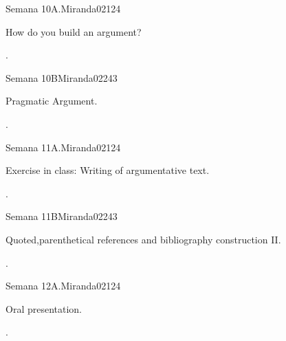 \begin{syllabus}
\begin{unit}{Semana 10A.}{}{Miranda02}{12}{4}
   \begin{topics}
      \item How do you build an argument?
   \end{topics}
   \begin{learningoutcomes}
      \item .
   \end{learningoutcomes}
\end{unit}

\begin{unit}{Semana 10B}{}{Miranda02}{24}{3}
   \begin{topics}
      \item Pragmatic Argument.
   \end{topics}

   \begin{learningoutcomes}
      \item . 
      \end{learningoutcomes}
\end{unit}

\begin{unit}{Semana 11A.}{}{Miranda02}{12}{4}
   \begin{topics}
      \item Exercise in class: Writing of argumentative text.
   \end{topics}
   \begin{learningoutcomes}
      \item .
   \end{learningoutcomes}
\end{unit}

\begin{unit}{Semana 11B}{}{Miranda02}{24}{3}
   \begin{topics}
      \item Quoted,parenthetical references and bibliography construction II.
   \end{topics}

   \begin{learningoutcomes}
      \item .
      \end{learningoutcomes}
\end{unit}

\begin{unit}{Semana 12A.}{}{Miranda02}{12}{4}
   \begin{topics}
      \item Oral presentation.
   \end{topics}
   \begin{learningoutcomes}
      \item .
   \end{learningoutcomes}
\end{unit}


\end{syllabus}
